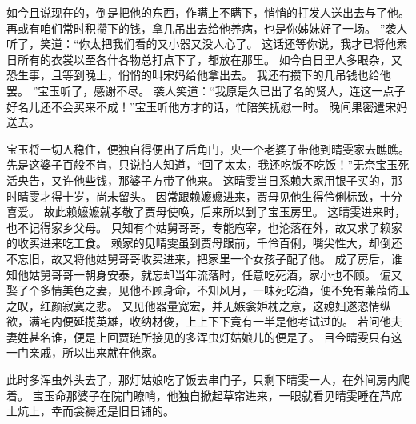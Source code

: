 如今且说现在的，倒是把他的东西，作瞒上不瞒下，悄悄的打发人送出去与了他。
再或有咱们常时积攒下的钱，拿几吊出去给他养病，也是你姊妹好了一场。
”袭人听了，笑道：“你太把我们看的又小器又没人心了。
这话还等你说，我才已将他素日所有的衣裳以至各什各物总打点下了，都放在那里。
如今白日里人多眼杂，又恐生事，且等到晚上，悄悄的叫宋妈给他拿出去。
我还有攒下的几吊钱也给他罢。
”宝玉听了，感谢不尽。
袭人笑道：“我原是久已出了名的贤人，连这一点子好名儿还不会买来不成！”宝玉听他方才的话，忙陪笑抚慰一时。
晚间果密遣宋妈送去。
\par
宝玉将一切人稳住，便独自得便出了后角门，央一个老婆子带他到晴雯家去瞧瞧。
先是这婆子百般不肯，只说怕人知道，“回了太太，我还吃饭不吃饭！”无奈宝玉死活央告，又许他些钱，那婆子方带了他来。
这晴雯当日系赖大家用银子买的，那时晴雯才得十岁，尚未留头。
因常跟赖嬷嬷进来，贾母见他生得伶俐标致，十分喜爱。
故此赖嬷嬷就孝敬了贾母使唤，后来所以到了宝玉房里。
这晴雯进来时，也不记得家乡父母。
只知有个姑舅哥哥，专能庖宰，也沦落在外，故又求了赖家的收买进来吃工食。
赖家的见晴雯虽到贾母跟前，千伶百俐，嘴尖性大，却倒还不忘旧，故又将他姑舅哥哥收买进来，把家里一个女孩子配了他。
成了房后，谁知他姑舅哥哥一朝身安泰，就忘却当年流落时，任意吃死酒，家小也不顾。
偏又娶了个多情美色之妻，见他不顾身命，不知风月，一味死吃酒，便不免有蒹葭倚玉之叹，红颜寂寞之悲。
又见他器量宽宏，并无嫉衾妒枕之意，这媳妇遂恣情纵欲，满宅内便延揽英雄，收纳材俊，上上下下竟有一半是他考试过的。
若问他夫妻姓甚名谁，便是上回贾琏所接见的多浑虫灯姑娘儿的便是了。
目今晴雯只有这一门亲戚，所以出来就在他家。
\par
此时多浑虫外头去了，那灯姑娘吃了饭去串门子，只剩下晴雯一人，在外间房内爬着。
宝玉命那婆子在院门瞭哨，他独自掀起草帘进来，一眼就看见晴雯睡在芦席土炕上，幸而衾褥还是旧日铺的。
